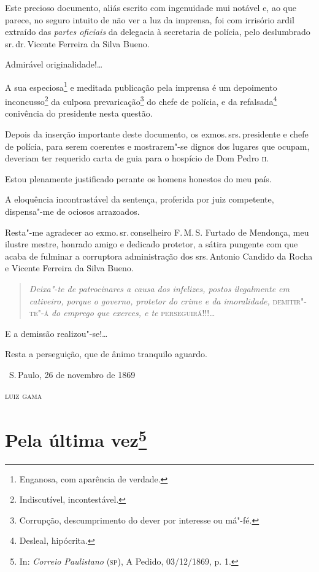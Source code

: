 Este precioso documento, aliás escrito com ingenuidade mui notável e, ao
que parece, no seguro intuito de não ver a luz da imprensa, foi com
irrisório ardil extraído das \emph{partes oficiais} da delegacia à
secretaria de polícia, pelo deslumbrado sr.\,dr.\,Vicente Ferreira da
Silva Bueno.

Admirável originalidade!\ldots{}

A sua especiosa\footnote{Enganosa, com aparência de verdade.} e
meditada publicação pela imprensa é um depoimento inconcusso\footnote{
  Indiscutível, incontestável.} da culposa prevaricação\footnote{
  Corrupção, descumprimento do dever por interesse ou má"-fé.} do chefe
de polícia, e da refalsada\footnote{Desleal, hipócrita.}
conivência do presidente
nesta questão.

Depois da inserção importante deste documento, os exmos.\,srs.\,presidente
e chefe de polícia, para serem coerentes e mostrarem"-se dignos dos
lugares que ocupam, deveriam ter requerido carta de guia para o hospício
de Dom Pedro \textsc{ii}.

Estou plenamente justificado perante os homens honestos do meu país.

A eloquência incontrastável da sentença, proferida por juiz competente,
dispensa"-me de ociosos arrazoados.

Resta"-me agradecer ao exmo.\,sr.\,conselheiro F.\,M.\,S. Furtado de
Mendonça, meu ilustre mestre, honrado amigo e dedicado protetor, a
sátira pungente com que acaba de fulminar a corruptora administração dos
srs.\,Antonio Candido da Rocha e Vicente Ferreira da Silva Bueno.

\begin{quote}
\emph{Deixa"-te de patrocinares a causa dos infelizes, postos
ilegalmente em cativeiro, porque o governo, protetor do crime e da
imoralidade,} \textsc{demitir"-te"-á} \emph{do emprego que exerces, e te}
\textsc{perseguirá}!!!\ldots{}
\end{quote}

E a demissão realizou"-se!\ldots{}

Resta a perseguição, que de ânimo tranquilo aguardo.

\bigskip

\hfill\ S.\,Paulo, 26 de novembro de 1869\smallskip

\hfill\textsc{luiz gama}


\chapter{Pela última vez\footnote[*]{In: \emph{Correio Paulistano}
  (\textsc{sp}), A Pedido, 03/12/1869, p. 1.}}

